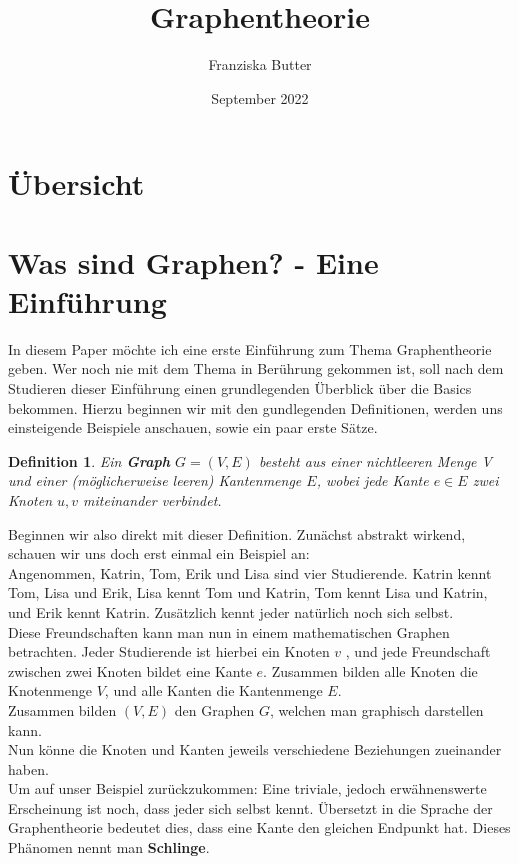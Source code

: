 \documentclass{article}
\title{Graphentheorie}
\author{Franziska Butter}
\date{September 2022}
\institute{Technische Universität Dresden}
\newtheorem{definition}{Definition}
\begin{document}
\maketitle

\section{Übersicht}
	\tableofcontents

\newpage

\section{Was sind Graphen? - Eine Einführung}
In diesem Paper möchte ich eine erste Einführung zum Thema Graphentheorie geben. Wer noch nie mit dem Thema in Berührung gekommen ist, soll nach dem Studieren dieser Einführung einen grundlegenden Überblick über die Basics bekommen. Hierzu beginnen wir mit den gundlegenden Definitionen, werden uns einsteigende Beispiele anschauen, sowie ein paar erste Sätze.\\
\bigskip
\begin{definition} 
            Ein \textbf{Graph} \( G = (V, E)\) besteht aus einer nichtleeren Menge V und einer (möglicherweise leeren) Kantenmenge \(E\), wobei jede Kante \(e \in E\) zwei Knoten \(u, v\) miteinander verbindet.
\end{definition}
\bigskip
Beginnen wir also direkt mit dieser Definition. Zunächst abstrakt wirkend, schauen wir uns doch erst einmal ein Beispiel an:\\
Angenommen, Katrin, Tom, Erik und Lisa sind vier Studierende. Katrin kennt Tom, Lisa und Erik, Lisa kennt Tom und Katrin, Tom kennt Lisa und Katrin, und Erik kennt Katrin. Zusätzlich kennt jeder natürlich noch sich selbst.\\
Diese Freundschaften kann man nun in einem mathematischen Graphen betrachten. Jeder Studierende ist hierbei ein Knoten \(v\) , und jede Freundschaft zwischen zwei Knoten bildet eine Kante \(e\). Zusammen bilden alle Knoten die Knotenmenge \(V\), und alle Kanten die Kantenmenge \(E\).\\
Zusammen bilden \((V, E)\) den Graphen \(G\), welchen man graphisch darstellen kann.\\
\bigskip
Nun könne die Knoten und Kanten jeweils verschiedene Beziehungen zueinander haben.\\
Um auf unser Beispiel zurückzukommen: Eine triviale, jedoch erwähnenswerte Erscheinung ist noch, dass jeder sich selbst kennt. Übersetzt in die Sprache der Graphentheorie bedeutet dies, dass eine Kante den gleichen Endpunkt hat. Dieses Phänomen nennt man \textbf{Schlinge}.
\end{document}
